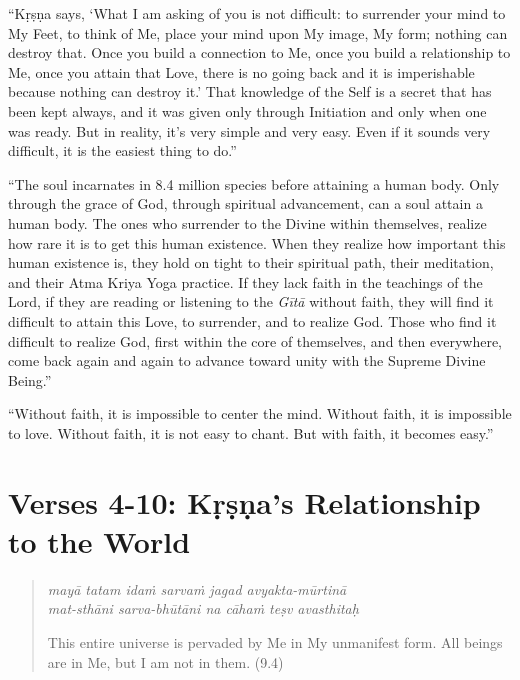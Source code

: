 \documentclass[12pt, twoside, openright]{memoir}
\begin{document}
\enquote{Kṛṣṇa says, \enquote{What I am asking of you is not difficult: to surrender your mind to My Feet, to think of Me, place your mind upon My image, My form; nothing can destroy that. Once you build a connection to Me, once you build a relationship to Me, once you attain that Love, there is no going back and it is imperishable because nothing can destroy it.} That knowledge of the Self is a secret that has been kept always, and it was given only through Initiation and only when one was ready. But in reality, it’s very simple and very easy. Even if it sounds very difficult, it is the easiest thing to do.}

\enquote{The soul incarnates in 8.4 million species before attaining a human body. Only through the grace of God, through spiritual advancement, can a soul attain a human body. The ones who surrender to the Divine within themselves, realize how rare it is to get this human existence. When they realize how important this human existence is, they hold on tight to their spiritual path, their meditation, and their Atma Kriya Yoga practice. If they lack faith in the teachings of the Lord, if they are reading or listening to the \textit{Gītā} without faith, they will find it difficult to attain this Love, to surrender, and to realize God. Those who find it difficult to realize God, first within the core of themselves, and then everywhere, come back again and again to advance toward unity with the Supreme Divine Being.}

\enquote{Without faith, it is impossible to center the mind. Without faith, it is impossible to love. Without faith, it is not easy to chant. But with faith, it becomes easy.}

\section{Verses 4-10: Kṛṣṇa's Relationship to the World}\label{sec-verses-4-10-krsna-s-relationship-to-the-world}


\par
\begin{verse}
\textit{mayā tatam idaṁ sarvaṁ jagad avyakta-mūrtinā} \\
\textit{mat-sthāni sarva-bhūtāni na cāhaṁ teṣv avasthitaḥ}

\noindent This entire universe is pervaded by Me in My unmanifest form. All beings are in Me, but I am not in them. (9.4)
\end{verse}
\par
\end{document}
